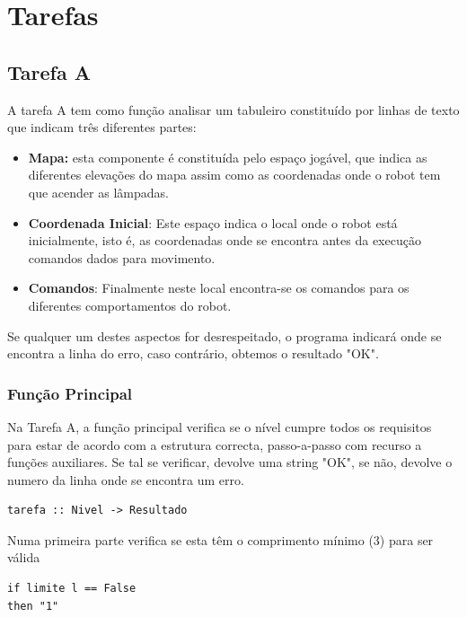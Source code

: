 \documentclass[a4paper]{article}
\begin{document}
\break
 

\section{Tarefas}
\subsection{Tarefa A}
A tarefa A tem como função analisar um tabuleiro constituído por linhas de texto que indicam três diferentes partes:

\begin{itemize}
\item \textbf{Mapa:} esta componente é constituída pelo espaço jogável, que indica as diferentes elevações do mapa assim como as coordenadas onde o robot tem que acender as lâmpadas.

\item \textbf{Coordenada Inicial}: Este espaço indica o local onde o robot está inicialmente, isto é, as coordenadas onde se encontra antes da execução comandos dados para movimento.

\item \textbf{Comandos}: Finalmente neste local encontra-se os comandos para os diferentes comportamentos do robot.

\end{itemize}

Se qualquer um destes aspectos for desrespeitado, o programa indicará onde se encontra a linha do erro, caso contrário, obtemos o resultado "OK".

\subsubsection{Função Principal}
Na Tarefa A, a função principal verifica se o nível cumpre todos os requisitos para estar de acordo com a estrutura correcta, passo-a-passo com recurso a funções auxiliares. Se tal se verificar, devolve uma string "OK", se não, devolve o numero da linha onde se encontra um erro.

\begin{lstlisting}[frame=single]
tarefa :: Nivel -> Resultado
\end{lstlisting}

Numa primeira parte verifica se esta têm o comprimento mínimo (3) para ser válida

\begin{lstlisting}[frame=single]
if limite l == False
then "1"
\end{lstlisting}
\end{document}
